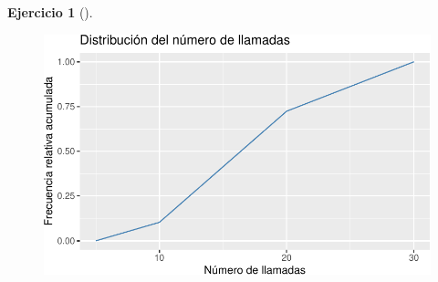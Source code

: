 \documentclass[
  a4paper,
]{scrreport}
\theoremstyle{definition}
\newtheorem{exercise}{Ejercicio}[chapter]
\theoremstyle{remark}
\begin{document}
\begin{exercise}[]
\begin{enumerate}
\begin{tcolorbox}
  \begin{figure}[H]

  {\centering \includegraphics{03-frecuencias-graficos_files/figure-pdf/unnamed-chunk-21-1.pdf}

  }

  \end{figure}

  \end{tcolorbox}
\end{enumerate}

\end{exercise}
\end{document}
